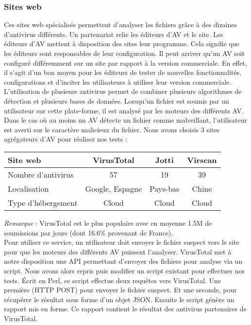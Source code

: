 \documentclass[smallextended]{svjour3}       %
\begin{document}
\subsubsection{Sites web}
\label{2.2.1sites}
Ces sites web spécialisés permettent d'analyser les fichiers grâce à des dizaines d'antivirus différents. Un partenariat relie les éditeurs d'AV et le site. Les éditeurs d'AV mettent à disposition des sites leur programme. Cela signifie que les éditeurs sont responsables de leur configuration. Il peut arriver qu'un AV soit configuré différemment sur un site par rapport à la version commerciale. En effet, il s'agit d'un bon moyen pour les éditeurs de tester de nouvelles fonctionnalités, configurations et d'inciter les utilisateurs à utiliser leur version commerciale. L'utilisation de plusieurs antivirus permet de combiner plusieurs algorithmes de détection et plusieurs bases de données. Lorsqu'un fichier est soumis par un utilisateur sur cette plate-forme, il est analysé par les moteurs des différents AV. Dans le cas où au moins un AV détecte un fichier comme malveillant, l'utilisateur est averti sur le caractère malicieux du fichier. Nous avons choisis 3 sites agrégateurs d'AV pour réaliser nos tests :\\
\begin{tabular}{|l|c|c|c|}
  \hline
   \textbf{Site web} & \textbf{VirusTotal} & \textbf{Jotti} & \textbf{Virscan} \\
   \hline
  Nombre d'antivirus & 57 & 19 & 39\\
  \hline
  Localisation & Google, Espagne & Pays-bas & Chine\\
  \hline
  Type d’hébergement & Cloud & Cloud & Cloud\\
  \hline
\end{tabular}
$ $\\
\textit{Remarque} : VirusTotal est le plus populaire avec en moyenne 1.5M de soumissions par jours (dont 16.6\% provenant de France).\\
$ $\\
Pour utiliser ce service, un utilisateur doit envoyer le fichier suspect vers le site pour que les moteurs des différents AV puissent l'analyser. VirusTotal met à notre disposition une API permettant d'envoyer des fichiers pour analyse via un script. Nous avons alors repris puis modifier un script \cite{API} existant pour effectuer nos tests. Écrit en Perl, ce script effectue deux requêtes vers VirusTotal. Une première (HTTP POST) pour envoyer le fichier suspect. Et une seconde, pour récupérer le résultat sous forme d'un objet JSON. Ensuite le script génère un rapport mis en forme. Ce rapport contient le résultat des antivirus partenaires de VirusTotal.\\
\end{document}
